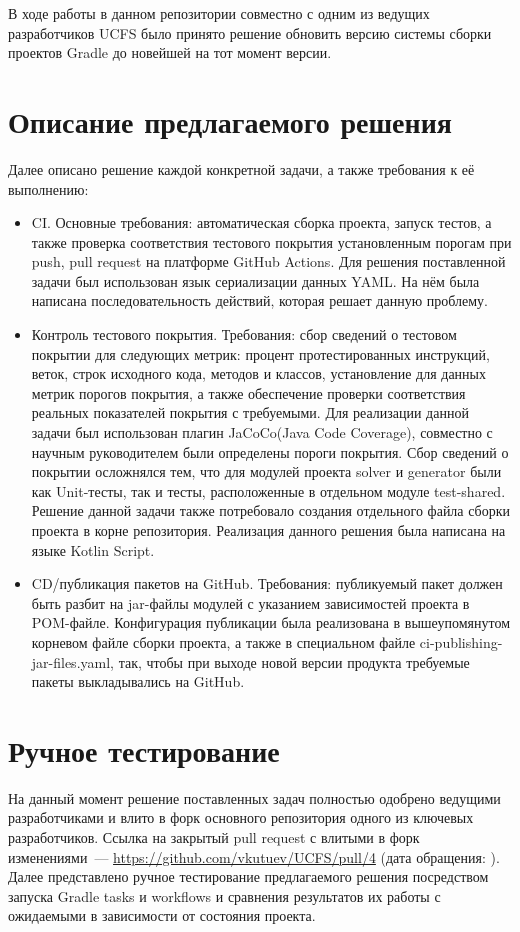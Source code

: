 \documentclass[a4paper]{article}
\begin{document}
В ходе работы в данном репозитории совместно с одним из ведущих разработчиков UCFS было принято решение обновить версию системы сборки проектов Gradle до новейшей на тот момент версии.


\section{Описание предлагаемого решения}


Далее описано решение каждой конкретной задачи, а также требования к её выполнению:
\begin{itemize}
    \item CI. Основные требования: автоматическая сборка проекта, запуск тестов, а также проверка соответствия тестового покрытия установленным порогам при push, pull request на платформе GitHub Actions. Для решения поставленной задачи был использован язык сериализации данных YAML. На нём была написана последовательность действий, которая решает данную проблему.
    \item Контроль тестового покрытия. Требования: сбор сведений о тестовом покрытии для следующих метрик: процент протестированных инструкций, веток, строк исходного кода, методов и классов, установление для данных метрик порогов покрытия, а также обеспечение проверки соответствия реальных показателей покрытия с требуемыми. Для реализации данной задачи был использован плагин JaCoCo(Java Code Coverage), совместно с научным руководителем были определены пороги покрытия. Сбор сведений о покрытии осложнялся тем, что для модулей проекта solver и generator были как Unit-тесты, так и тесты, расположенные в отдельном модуле test-shared. Решение данной задачи также потребовало создания отдельного файла сборки проекта в корне репозитория. Реализация данного решения была написана на языке Kotlin Script.
    \item CD/публикация пакетов на GitHub. Требования: публикуемый пакет должен быть разбит на jar-файлы модулей с указанием зависимостей проекта в POM-файле. Конфигурация публикации была реализована в вышеупомянутом корневом файле сборки проекта, а также в специальном файле ci-publishing-jar-files.yaml, так, чтобы при выходе новой версии продукта требуемые пакеты выкладывались на GitHub.
\end{itemize}

\section{Ручное тестирование}
На данный момент решение поставленных задач полностью одобрено ведущими разработчиками и влито в форк основного репозитория одного из ключевых разработчиков. Ссылка на закрытый pull request с влитыми в форк изменениями~--- \url{https://github.com/vkutuev/UCFS/pull/4} (дата обращения: ). Далее представлено ручное тестирование предлагаемого решения посредством запуска Gradle tasks и workflows и сравнения результатов их работы с ожидаемыми в зависимости от состояния проекта.
\end{document}
